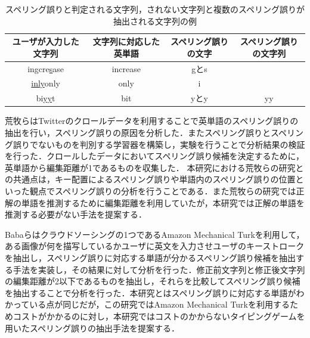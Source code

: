 \documentclass{jarticle}
\begin{document}
 \begin{table}[t]
  \small
  \centering
   \caption{スペリング誤りと判定される文字列，されない文字列と複数のスペリング誤りが抽出される文字列の例}
   \begin{tabular}{|c|c|c|c|} \hline
       	ユーザが入力した文字列 & 文字列に対応した英単語 & スペリング誤りの文字 & スペリング誤りの文字列\\ \hline
		in\underline{g}cre\underline{s}ase & increase & gとs & \\ \hline
		\underline{inly}only & only & i & \\ \hline
	    bi\underline{yy}t & bit & yとy & yy\\ \hline
   \end{tabular}
 \end{table}

荒牧らはTwitterのクロールデータを利用することで英単語のスペリング誤りの抽出を行い，スペリング誤りの原因を分析した\cite{aramakiNLP2010}．またスペリング誤りとスペリング誤りでないものを判別する学習器を構築し，実験を行うことで分析結果の検証を行った．クロールしたデータにおいてスペリング誤り候補を決定するために，英単語から編集距離が1であるものを収集した．
本研究における荒牧らの研究との共通点は，キー配置によるスペリング誤りや単語内のスペリング誤りの位置といった観点でスペリング誤りの分析を行うことである．また荒牧らの研究では正解の単語を推測するために編集距離を利用していたが，本研究では正解の単語を推測する必要がない手法を提案する．

Babaらはクラウドソーシングの1つであるAmazon Mechanical Turkを利用して，ある画像が何を描写しているかユーザに英文を入力させユーザのキーストロークを抽出し，スペリング誤りに対応する単語が分かるスペリング誤り候補を抽出する手法を実装し，その結果に対して分析を行った\cite{babaACL2012}．修正前文字列と修正後文字列の編集距離が2以下であるものを抽出し，それらを比較してスペリング誤り候補を抽出することで分析を行った．本研究とはスペリング誤りに対応する単語がわかっている点が同じだが，この研究ではAmazon Mechanical Turkを利用するためコストがかかるのに対し，本研究ではコストのかからないタイピングゲームを用いたスペリング誤りの抽出手法を提案する．
\end{document}
